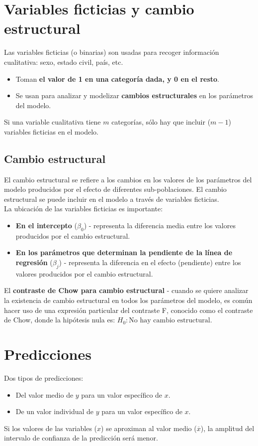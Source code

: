 \documentclass[10pt, a4paper, landscape]{extarticle}
\begin{document}
\begin{multicols}{3}
\section*{Variables ficticias y cambio estructural}
	Las variables ficticias (o binarias) son usadas para recoger información cualitativa: sexo, estado civil, país, etc.
	\begin{itemize}[leftmargin=*]
		\item Toman \textbf{el valor de 1 en una categoría dada, y 0 en el resto}.
		\item Se usan para analizar y modelizar \textbf{cambios estructurales} en los parámetros del modelo.
	\end{itemize}
	Si una variable cualitativa tiene $m$ categorías, sólo hay que incluir ($m-1$) variables ficticias en el modelo.
	\subsection*{Cambio estructural}
		El cambio estructural se refiere a los cambios en los valores de los parámetros del modelo producidos por el efecto de diferentes sub-poblaciones. El cambio estructural se puede incluir en el modelo a través de variables ficticias. \\
		La ubicación de las variables ficticias es importante:
		\begin{itemize}[leftmargin=*]
			\item \textbf{En el intercepto} ($\beta_0$) - representa la diferencia media entre los valores producidos por el cambio estructural.
			\item \textbf{En los parámetros que determinan la pendiente de la línea de regresión} ($\beta_j$) - representa la diferencia en el efecto (pendiente) entre los valores producidos por el cambio estructural.
		\end{itemize}
		El \textbf{contraste de Chow para cambio estructural} - cuando se quiere analizar la existencia de cambio estructural en todos los parámetros del modelo, es común hacer uso de una expresión particular del contraste F, conocido como el contraste de Chow, donde la hipótesis nula es: $H_0: \text{No hay cambio estructural}$.

\section*{Predicciones}
	Dos tipos de predicciones:
	\begin{itemize}[leftmargin=*]
		\item Del valor medio de $y$ para un valor específico de $x$.
		\item De un valor individual de $y$ para un valor específico de $x$.
	\end{itemize}
	Si los valores de las variables ($x$) se aproximan al valor medio ($\overline{x}$), la amplitud del intervalo de confianza de la predicción será menor. 
\columnbreak

\end{multicols}
\end{document}
